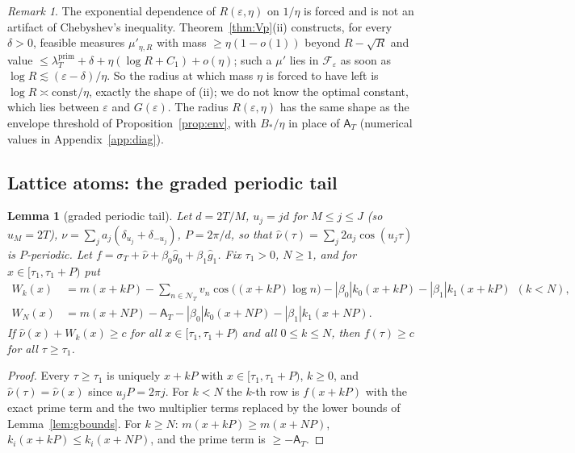 \documentclass[11pt]{amsart}
\newtheorem{lemma}[theorem]{Lemma}
\theoremstyle{definition}
\theoremstyle{remark}
\newtheorem{remark}[theorem]{Remark}
\newcommand{\lamP}{\lambda^{\mathrm{prim}}_T}
\newcommand{\sT}{\sigma_T}
\newcommand{\gh}[1]{\widehat g_{#1}}
\newcommand{\nuh}{\widehat\nu}
\newcommand{\NT}{\mathcal N_T}
\newcommand{\Aconst}{\mathsf A_T}
\begin{document}
\begin{remark}\label{rem:P3exp}
The exponential dependence of $R(\varepsilon,\eta)$ on $1/\eta$ is forced and is not an artifact of
Chebyshev's inequality. Theorem~\ref{thm:Vp}(ii) constructs, for every $\delta>0$, feasible measures
$\mu'_{\eta,R}$ with mass $\ge\eta(1-o(1))$ beyond $R-\sqrt R$ and value
$\le\lamP+\delta+\eta(\log R+C_1)+o(\eta)$; such a $\mu'$ lies in $\mathcal F_\varepsilon$ as soon as
$\log R\lesssim(\varepsilon-\delta)/\eta$. So the radius at which mass $\eta$ is forced to have left
is $\log R\asymp\mathrm{const}/\eta$, exactly the shape of (ii); we do not know the optimal
constant, which lies between $\varepsilon$ and $G(\varepsilon)$. The radius $R(\varepsilon,\eta)$ has
the same shape as the envelope threshold of Proposition~\ref{prop:env}, with $B_*/\eta$ in place of
$\Aconst$ (numerical values in Appendix~\ref{app:diag}).
\end{remark}

\subsection{Lattice atoms: the graded periodic tail}

\begin{lemma}[graded periodic tail]\label{lem:F1}
Let $d=2T/M$, $u_j=jd$ for $M\le j\le J$ (so $u_M=2T$), $\nu=\sum_ja_j(\delta_{u_j}+\delta_{-u_j})$,
$P=2\pi/d$, so that $\nuh(\tau)=\sum_j2a_j\cos(u_j\tau)$ is $P$-periodic. Let
$f=\sT+\nuh+\beta_0\gh0+\beta_1\gh1$. Fix $\tau_1>0$, $N\ge1$, and for $x\in[\tau_1,\tau_1+P)$ put
\begin{align*}
W_k(x)&=m(x+kP)-\sum_{n\in\NT}v_n\cos\big((x+kP)\log n\big)-|\beta_0|k_0(x+kP)-|\beta_1|k_1(x+kP)\ \ (k<N),\\
W_N(x)&=m(x+NP)-\Aconst-|\beta_0|k_0(x+NP)-|\beta_1|k_1(x+NP).
\end{align*}
If $\nuh(x)+W_k(x)\ge c$ for all $x\in[\tau_1,\tau_1+P)$ and all $0\le k\le N$, then $f(\tau)\ge c$
for all $\tau\ge\tau_1$.
\end{lemma}
\begin{proof}
Every $\tau\ge\tau_1$ is uniquely $x+kP$ with $x\in[\tau_1,\tau_1+P)$, $k\ge0$, and
$\nuh(\tau)=\nuh(x)$ since $u_jP=2\pi j$. For $k<N$ the $k$-th row is $f(x+kP)$ with the exact
prime term and the two multiplier terms replaced by the lower bounds of Lemma~\ref{lem:gbounds}.
For $k\ge N$: $m(x+kP)\ge m(x+NP)$, $k_i(x+kP)\le k_i(x+NP)$, and the prime term is $\ge-\Aconst$.
\end{proof}
\end{document}
